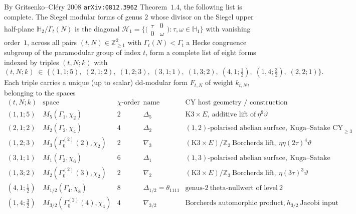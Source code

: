 \begin{theorem}
\label{thm:eight-form-cy-host-catalogue}
By Gritsenko--Cl\'ery 2008
\texttt{arXiv:0812.3962} Theorem~$1.4$, the following list is complete.
The Siegel modular forms of genus $2$ whose divisor on the
Siegel upper half-plane $\mathbb{H}_2 / \Gamma_t(N)$ is the diagonal
$\mathcal{H}_1 = \{\bigl(\begin{smallmatrix} \tau & 0 \\ 0 &
\omega \end{smallmatrix}\bigr) : \tau, \omega \in \mathbb{H}_1\}$
with vanishing order~$1$, across all pairs $(t, N) \in
\mathbb{Z}_{\geq 1}^2$ with $\Gamma_t(N) < \Gamma_t$ a Hecke
congruence subgroup of the paramodular group of index $t$, form a
complete list of eight forms indexed by triples $(t, N; k)$ with
\[
 (t, N; k) \;\in\;
 \bigl\{(1, 1; 5),\; (2, 1; 2),\; (1, 2; 3),\; (3, 1; 1),\; (1, 3; 2),\;
 (4, 1; \tfrac{1}{2}),\; (1, 4; \tfrac{3}{2}),\; (2, 2; 1)\bigr\}.
\]
Each triple carries a unique (up to scalar) dd-modular form $F_{t, N}$
of weight $k_{t, N}$, belonging to the spaces
\[
\begin{array}{c|c|c|l|l}
 (t, N; k) & \text{space} & \chi\text{-order} & \text{name} & \text{CY host geometry / construction} \\ \hline
 (1, 1; 5) & M_5(\Gamma_1, \chi_2) & 2 & \Delta_5 & \mathrm{K3}\times E,\ \text{additive lift of}\ \eta^9\vartheta \\
 (2, 1; 2) & M_2(\Gamma_2, \chi_4) & 4 & \Delta_2 & (1, 2)\text{-polarised abelian surface},\ \text{Kuga--Satake CY}_{\geq 3} \\
 (1, 2; 3) & M_3(\Gamma_0^{(2)}(2), \chi_2) & 2 & \nabla_3 & (\mathrm{K3}\times E)/\mathbb Z_2\ \text{Borcherds lift},\ \eta \eta(2\tau)^4 \vartheta \\
 (3, 1; 1) & M_1(\Gamma_3, \chi_6) & 6 & \Delta_1 & (1, 3)\text{-polarised abelian surface},\ \text{Kuga--Satake} \\
 (1, 3; 2) & M_2(\Gamma_0^{(2)}(3), \chi_2) & 2 & \nabla_2 & (\mathrm{K3}\times E)/\mathbb Z_3\ \text{Borcherds lift},\ \eta(3\tau)^3 \vartheta \\
 (4, 1; \tfrac{1}{2}) & M_{1/2}(\Gamma_4, \chi_8) & 8 & \Delta_{1/2} = \theta_{1111} & \text{genus-}2\ \text{theta-nullwert of level}\ 2 \\
 (1, 4; \tfrac{3}{2}) & M_{3/2}(\Gamma_0^{(2)}(4), \chi_4) & 4 & \nabla_{3/2} & \text{Borcherds automorphic product,}\ h_{3/2}\ \text{Jacobi input} \\

\end{array}\]
\end{theorem}
